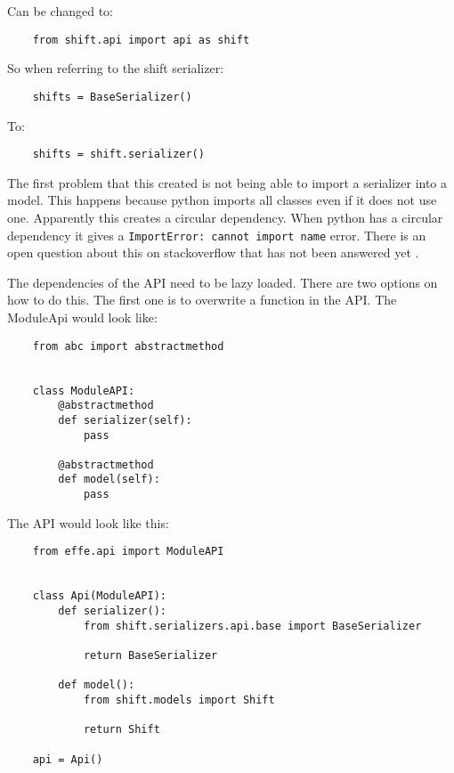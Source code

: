 Can be changed to:
\begin{verbatim}
    from shift.api import api as shift
\end{verbatim}

So when referring to the shift serializer:
\begin{verbatim}
    shifts = BaseSerializer()
\end{verbatim}

To:
\begin{verbatim}
    shifts = shift.serializer()
\end{verbatim}

The first problem that this created is not being able to import a serializer into a model. This happens because python imports all classes even if it does not use one. Apparently this creates a circular dependency. When python has a circular dependency it gives a \texttt{ImportError: cannot import name} error. There is an open question about this on stackoverflow that has not been answered yet \cite{circularDependencyQuestion}.

The dependencies of the API need to be lazy loaded. There are two options on how to do this. The first one is to overwrite a function in the API. The ModuleApi would look like:
\begin{verbatim}
    from abc import abstractmethod


    class ModuleAPI:
        @abstractmethod
        def serializer(self):
            pass

        @abstractmethod
        def model(self):
            pass
\end{verbatim}

The API would look like this:
\begin{verbatim}
    from effe.api import ModuleAPI


    class Api(ModuleAPI):
        def serializer():
            from shift.serializers.api.base import BaseSerializer

            return BaseSerializer

        def model():
            from shift.models import Shift

            return Shift

    api = Api()
\end{verbatim}

